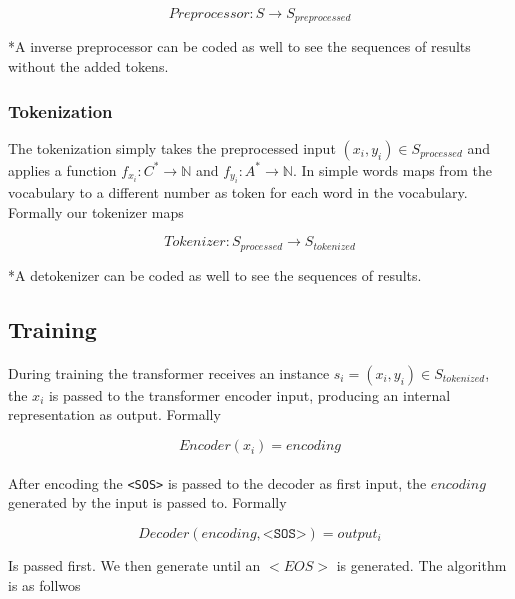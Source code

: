 \documentclass[]{article}
\begin{document}
\begin{equation}
    Preprocessor: S \rightarrow S_{preprocessed}
\end{equation}

*A inverse preprocessor can be coded as well to see the sequences of results without the added tokens.

\subsubsection*{Tokenization}
The tokenization simply takes the preprocessed input $(x_i, y_i) \in S_{processed}$ and applies a function $f_{x_i}: C^* \rightarrow \mathbb{N}$ and $f_{y_i}: A^* \rightarrow \mathbb{N}$. In simple words maps from the vocabulary to a different number as token for each word in the vocabulary. Formally our tokenizer maps

\begin{equation}
    Tokenizer: S_{processed} \rightarrow S_{tokenized}
\end{equation}

*A detokenizer can be coded as well to see the sequences of results.

\subsection*{Training}
\paragraph*{}
During training the transformer receives an instance $s_i = (x_i, y_i) \in S_{tokenized}$, the $x_i$ is passed to the transformer encoder input, producing an internal representation as output. Formally


\begin{equation}
    Encoder(x_i) = encoding
\end{equation}

\paragraph*{}
After encoding the \texttt{<SOS>} is passed to the decoder as first input, the $encoding$ generated by the input is passed to. Formally

\begin{equation}
    Decoder(encoding, \texttt{<SOS>}) = output_i
\end{equation}

Is passed first. We then generate until an $<EOS>$ is generated. The algorithm is as follwos
\end{document}
